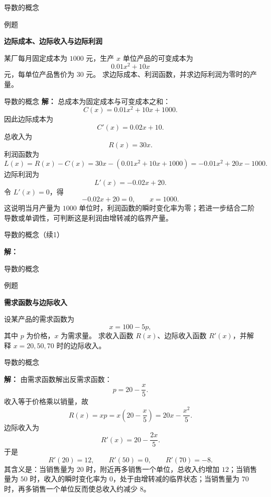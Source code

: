 \documentclass[aspectratio=169,10pt,fontset=fandol]{ctexbeamer}
\begin{document}
\begin{frame}[t,fragile]{导数的概念}
\normalsize
\begin{block}{例题}
{\normalsize
\textbf{边际成本、边际收入与边际利润}\par

某厂每月固定成本为 $1000$ 元，生产 $x$ 单位产品的可变成本为
\[
0.01x^2+10x
\]
元，每单位产品售价为 $30$ 元。 求边际成本、利润函数，并求边际利润为零时的产量。

}
\end{block}
\end{frame}
\begin{frame}[t,fragile]{导数的概念}
\footnotesize
{\footnotesize
\textbf{解：}
总成本为固定成本与可变成本之和：
\[
C(x)=0.01x^2+10x+1000.
\]
因此边际成本为
\[
C'(x)=0.02x+10.
\]
总收入为
\[
R(x)=30x.
\]
利润函数为
\[
L(x)=R(x)-C(x)=30x-(0.01x^2+10x+1000)
=-0.01x^2+20x-1000.
\]
边际利润为
\[
L'(x)=-0.02x+20.
\]
令 $L'(x)=0$，得
\[
-0.02x+20=0,\qquad x=1000.
\]
这说明当月产量为 $1000$ 单位时，利润函数的瞬时变化率为零；若进一步结合二阶导数或单调性，可判断这是利润由增转减的临界产量。
}
\end{frame}
\begin{frame}[t,fragile]{导数的概念（续1）}
\normalsize
{\normalsize
\textbf{解：}


}
\end{frame}
\begin{frame}[t,fragile]{导数的概念}
\normalsize
\begin{block}{例题}
{\normalsize
\textbf{需求函数与边际收入}\par

设某产品的需求函数为
\[
x=100-5p,
\]
其中 $p$ 为价格，$x$ 为需求量。 求收入函数 $R(x)$、边际收入函数 $R'(x)$，并解释 $x=20,50,70$ 时的边际收入。

}
\end{block}
\end{frame}
\begin{frame}[t,fragile]{导数的概念}
\footnotesize
{\footnotesize
\textbf{解：}
由需求函数解出反需求函数：
\[
p=20-\frac{x}{5}.
\]
收入等于价格乘以销量，故
\[
R(x)=xp=x\left(20-\frac{x}{5}\right)=20x-\frac{x^2}{5}.
\]
边际收入为
\[
R'(x)=20-\frac{2x}{5}.
\]
于是
\[
R'(20)=12,\qquad R'(50)=0,\qquad R'(70)=-8.
\]
其含义是：当销售量为 $20$ 时，附近再多销售一个单位，总收入约增加 $12$；当销售量为 $50$ 时，收入的瞬时变化率为 $0$，处于由增转减的临界状态；当销售量为 $70$ 时，再多销售一个单位反而使总收入约减少 $8$。

}
\end{frame}
\end{document}
